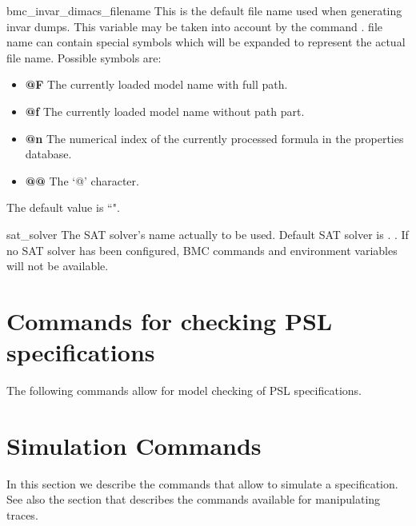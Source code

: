 \begin{nusmvVar} {bmc\_invar\_dimacs\_filename}{}{}
This is the default file name used when generating \dimacs invar
dumps. This variable may be taken into account by the command
.  \dimacs file name can contain special symbols which will
be expanded to represent the actual file name. Possible symbols are:
\begin{itemize}
\item {\bf @F}
The currently loaded model name with full path.
\item {\bf @f}
The currently loaded model name without path part.
\item {\bf @n}
The numerical index of the currently processed formula in the properties
database.
\item {\bf @@}
The `@' character.
\end{itemize}
The default value is ``".\\
\end{nusmvVar}

\begin{nusmvVar} {sat\_solver}{}{\minisat}
The SAT solver's name actually to be used. Default SAT solver
is \minisat. \minisatnotice. If no SAT
solver has been configured, BMC commands and environment variables
will not be available.
\end{nusmvVar}



\section{Commands for checking PSL specifications}
\label{Commands for checking PSL specifications}

The following commands allow for model checking of PSL specifications.








\section{Simulation Commands}
\label{Simulation Commands}

In this section we describe the commands that allow to simulate a
\nusmv specification. See also the section  that
describes the commands available for manipulating traces.

